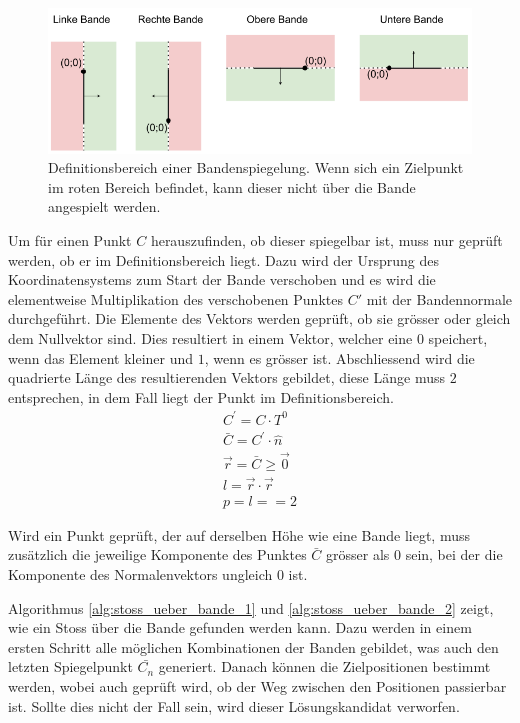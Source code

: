 \begin{figure}[h!]
    \begin{center}
        \includegraphics[width=1\linewidth]{../common/03_billiard_ai/resources/49_definitionsbereich_spiegelung_bande.png}
    \end{center}
    \caption{Definitionsbereich einer Bandenspiegelung. Wenn sich ein Zielpunkt im roten Bereich befindet, kann dieser nicht über die Bande angespielt werden.}
    \label{fig:Definitionsbereich_Bandenspiegelung}
\end{figure}

Um für einen Punkt $C$ herauszufinden, ob dieser spiegelbar ist, muss nur geprüft werden, ob er im Definitionsbereich liegt.
Dazu wird der Ursprung des Koordinatensystems zum Start der Bande verschoben und es wird die elementweise Multiplikation
des verschobenen Punktes $C'$ mit der Bandennormale durchgeführt.
Die Elemente des Vektors werden geprüft, ob sie grösser oder gleich dem Nullvektor sind.
Dies resultiert in einem Vektor, welcher eine $0$ speichert, wenn das Element kleiner und $1$, wenn es grösser ist.
Abschliessend wird die quadrierte Länge des resultierenden Vektors gebildet, diese Länge muss $2$ entsprechen, in dem
Fall liegt der Punkt im Definitionsbereich.
\begin{align}
    C^{'} = C \cdot T^0\\
    \bar{C} = C^{'} \cdot \hat{n}\\
    \vec{r} = \bar{C} \geq \vec{0}\\
    l = \vec{r} \cdot \vec{r}\\
    p = l == 2
\end{align}

Wird ein Punkt geprüft, der auf derselben Höhe wie eine Bande liegt, muss zusätzlich die jeweilige Komponente des Punktes
$\bar{C}$ grösser als $0$ sein, bei der die Komponente des Normalenvektors ungleich $0$ ist.

\clearpage
Algorithmus \ref{alg:stoss_ueber_bande_1} und \ref{alg:stoss_ueber_bande_2} zeigt, wie ein Stoss über die Bande gefunden werden kann.
Dazu werden in einem ersten Schritt alle möglichen Kombinationen der Banden gebildet, was auch den letzten Spiegelpunkt
$\bar{C_n}$ generiert. Danach können die Zielpositionen bestimmt werden, wobei auch geprüft wird, ob der Weg zwischen
den Positionen passierbar ist. Sollte dies nicht der Fall sein, wird dieser Lösungskandidat verworfen.

